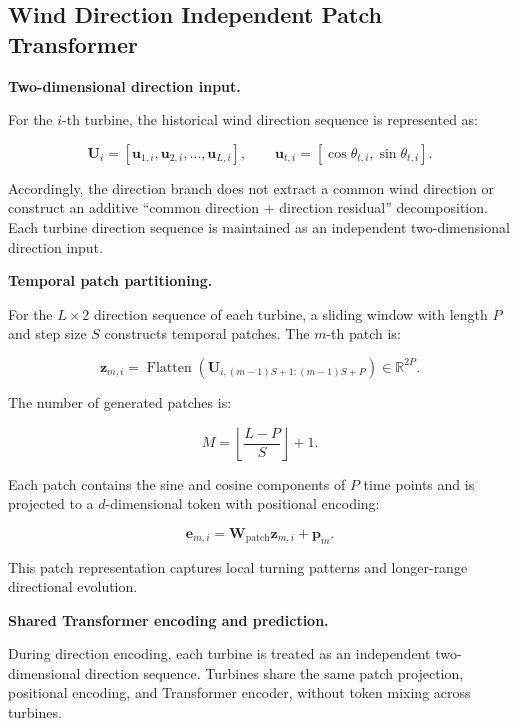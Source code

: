 \subsection{Wind Direction Independent Patch Transformer}

\textbf{Two-dimensional direction input.}

For the $i$-th turbine, the historical wind direction sequence is represented as:

\begin{equation}
\mathbf{U}_i = \left[ \mathbf{u}_{1,i}, \mathbf{u}_{2,i}, \ldots, \mathbf{u}_{L,i} \right], \qquad \mathbf{u}_{t,i} = [\cos\theta_{t,i}, \sin\theta_{t,i}].
\end{equation}

Accordingly, the direction branch does not extract a common wind direction or construct an additive ``common direction + direction residual'' decomposition. Each turbine direction sequence is maintained as an independent two-dimensional direction input.

\textbf{Temporal patch partitioning.}

For the $L\times 2$ direction sequence of each turbine, a sliding window with length $P$ and step size $S$ constructs temporal patches. The $m$-th patch is:

\begin{equation}
\mathbf{z}_{m,i} = \operatorname{Flatten} \left( \mathbf{U}_{i,(m-1)S+1:(m-1)S+P} \right) \in \mathbb{R}^{2P}.
\end{equation}

The number of generated patches is:

\begin{equation}
M = \left\lfloor \frac{L-P}{S} \right\rfloor+1.
\end{equation}

Each patch contains the sine and cosine components of $P$ time points and is projected to a $d$-dimensional token with positional encoding:

\begin{equation}
\mathbf{e}_{m,i} = \mathbf{W}_{\mathrm{patch}}\mathbf{z}_{m,i} + \mathbf{p}_m.
\end{equation}

This patch representation captures local turning patterns and longer-range directional evolution.

\textbf{Shared Transformer encoding and prediction.}

During direction encoding, each turbine is treated as an independent two-dimensional direction sequence. Turbines share the same patch projection, positional encoding, and Transformer encoder, without token mixing across turbines.

